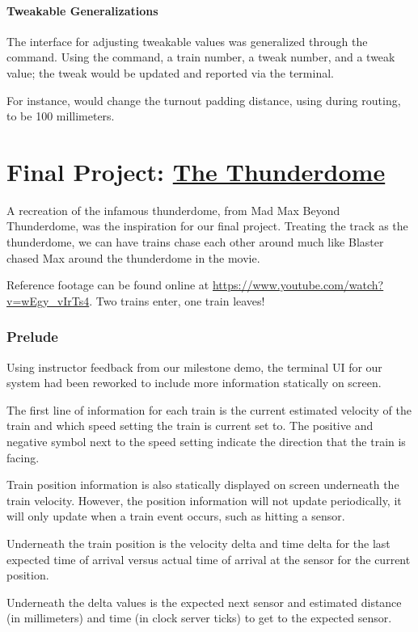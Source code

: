\documentclass[pdftex,10pt,a4paper]{article}
\begin{document}
\subsection*{Tweakable Generalizations}

The interface for adjusting tweakable values was generalized through
the  command. Using the command, a train number, a tweak
number, and a tweak value; the tweak would be updated and reported
via the terminal.

For instance,  would change the turnout padding
distance, using during routing, to be 100 millimeters.

\part*{Final Project: \underline{The Thunderdome}}

A recreation of the infamous thunderdome, from Mad Max Beyond
Thunderdome, was the inspiration for our final project. Treating the
track as the thunderdome, we can have trains chase each other around
much like Blaster chased Max around the thunderdome in the movie.

Reference footage can be found online at
\url{https://www.youtube.com/watch?v=wEgy\_vIrTs4}. Two trains enter,
one train leaves!

\section*{Prelude}

Using instructor feedback from our milestone demo, the terminal UI for
our system had been reworked to include more information statically on
screen.

The first line of information for each train is the current estimated
velocity of the train and which speed setting the train is current set
to. The positive and negative symbol next to the speed setting
indicate the direction that the train is facing.

Train position information is also statically displayed on screen
underneath the train velocity. However, the position information will
not update periodically, it will only update when a train event
occurs, such as hitting a sensor.

Underneath the train position is the velocity delta and time delta
for the last expected time of arrival versus actual time of arrival at
the sensor for the current position.

Underneath the delta values is the expected next sensor and estimated
distance (in millimeters) and time (in clock server ticks) to get to
the expected sensor.
\end{document}
